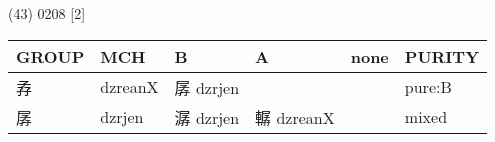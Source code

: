 \documentclass[14pt,a4paper]{scrartcl}
\begin{document}
(43) 0208 {[}2{]}

\begin{longtable}[c]{@{}llllll@{}}
\toprule
\begin{minipage}[b]{0.14\columnwidth}\raggedright\strut
GROUP
\strut\end{minipage} &
\begin{minipage}[b]{0.14\columnwidth}\raggedright\strut
MCH
\strut\end{minipage} &
\begin{minipage}[b]{0.14\columnwidth}\raggedright\strut
B
\strut\end{minipage} &
\begin{minipage}[b]{0.14\columnwidth}\raggedright\strut
A
\strut\end{minipage} &
\begin{minipage}[b]{0.14\columnwidth}\raggedright\strut
none
\strut\end{minipage} &
\begin{minipage}[b]{0.14\columnwidth}\raggedright\strut
PURITY
\strut\end{minipage}\tabularnewline
\midrule
\endhead
\begin{minipage}[t]{0.14\columnwidth}\raggedright\strut
孨
\strut\end{minipage} &
\begin{minipage}[t]{0.14\columnwidth}\raggedright\strut
dzreanX
\strut\end{minipage} &
\begin{minipage}[t]{0.14\columnwidth}\raggedright\strut
孱 dzrjen
\strut\end{minipage} &
\begin{minipage}[t]{0.14\columnwidth}\raggedright\strut
\strut\end{minipage} &
\begin{minipage}[t]{0.14\columnwidth}\raggedright\strut
\strut\end{minipage} &
\begin{minipage}[t]{0.14\columnwidth}\raggedright\strut
pure:B
\strut\end{minipage}\tabularnewline
\begin{minipage}[t]{0.14\columnwidth}\raggedright\strut
孱
\strut\end{minipage} &
\begin{minipage}[t]{0.14\columnwidth}\raggedright\strut
dzrjen
\strut\end{minipage} &
\begin{minipage}[t]{0.14\columnwidth}\raggedright\strut
潺 dzrjen
\strut\end{minipage} &
\begin{minipage}[t]{0.14\columnwidth}\raggedright\strut
轏 dzreanX
\strut\end{minipage} &
\begin{minipage}[t]{0.14\columnwidth}\raggedright\strut
\strut\end{minipage} &
\begin{minipage}[t]{0.14\columnwidth}\raggedright\strut
mixed
\strut\end{minipage}\tabularnewline
\bottomrule
\end{longtable}
\end{document}
